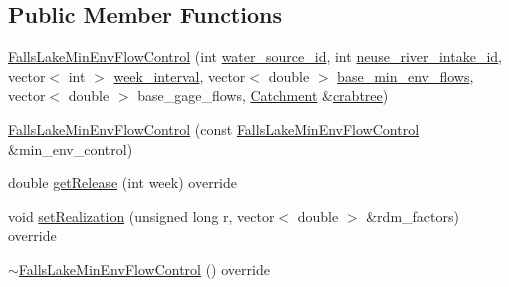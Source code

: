 \subsection*{Public Member Functions}
\begin{DoxyCompactItemize}
\item 
\mbox{\hyperlink{classFallsLakeMinEnvFlowControl_a9cef248e2fd8a194c92454a79398a6a6_a9cef248e2fd8a194c92454a79398a6a6}{Falls\+Lake\+Min\+Env\+Flow\+Control}} (int \mbox{\hyperlink{classMinEnvFlowControl_aada518a047598f386daec1d0358023aa_aada518a047598f386daec1d0358023aa}{water\+\_\+source\+\_\+id}}, int \mbox{\hyperlink{classFallsLakeMinEnvFlowControl_aa0e54d145d945d9b8c462294187e7fb5_aa0e54d145d945d9b8c462294187e7fb5}{neuse\+\_\+river\+\_\+intake\+\_\+id}}, vector$<$ int $>$ \mbox{\hyperlink{classFallsLakeMinEnvFlowControl_a382dbd49bfc62c5e6ba2a56cfb7682e3_a382dbd49bfc62c5e6ba2a56cfb7682e3}{week\+\_\+interval}}, vector$<$ double $>$ \mbox{\hyperlink{classFallsLakeMinEnvFlowControl_a7780ba93a2ea312c6f48ff741f6f8291_a7780ba93a2ea312c6f48ff741f6f8291}{base\+\_\+min\+\_\+env\+\_\+flows}}, vector$<$ double $>$ base\+\_\+gage\+\_\+flows, \mbox{\hyperlink{classCatchment}{Catchment}} \&\mbox{\hyperlink{classFallsLakeMinEnvFlowControl_af12d738a62d604cd01ee48bfc6c73c6d_af12d738a62d604cd01ee48bfc6c73c6d}{crabtree}})
\item 
\mbox{\hyperlink{classFallsLakeMinEnvFlowControl_a0ac46bcd8bea2e6e56824b5398129418_a0ac46bcd8bea2e6e56824b5398129418}{Falls\+Lake\+Min\+Env\+Flow\+Control}} (const \mbox{\hyperlink{classFallsLakeMinEnvFlowControl}{Falls\+Lake\+Min\+Env\+Flow\+Control}} \&min\+\_\+env\+\_\+control)
\item 
double \mbox{\hyperlink{classFallsLakeMinEnvFlowControl_a50453b443fb6e5869fcfc9a183f42b2f_a50453b443fb6e5869fcfc9a183f42b2f}{get\+Release}} (int week) override
\item 
void \mbox{\hyperlink{classFallsLakeMinEnvFlowControl_a6ea8a5e9ff9179066cceb77d896f3f97_a6ea8a5e9ff9179066cceb77d896f3f97}{set\+Realization}} (unsigned long r, vector$<$ double $>$ \&rdm\+\_\+factors) override
\item 
\mbox{\hyperlink{classFallsLakeMinEnvFlowControl_a747aefedd1e590007206ef08145be351_a747aefedd1e590007206ef08145be351}{$\sim$\+Falls\+Lake\+Min\+Env\+Flow\+Control}} () override
\end{DoxyCompactItemize}
